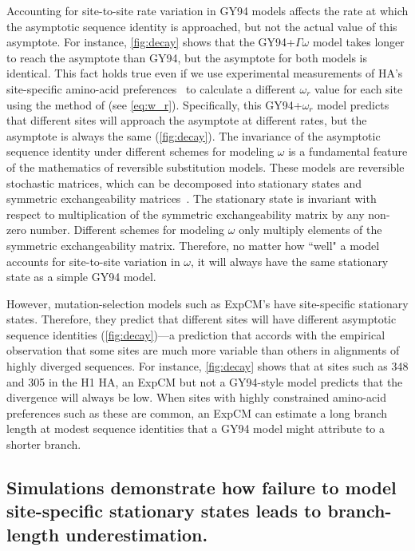 \documentclass[11pt]{article}
\begin{document}
Accounting for site-to-site rate variation in GY94 models affects the rate at which the asymptotic sequence identity is approached, but not the actual value of this asymptote. 
For instance, \ref{fig:decay} shows that the GY94+$\Gamma\omega$ model takes longer to reach the asymptote than GY94, but the asymptote for both models is identical. 
This fact holds true even if we use experimental measurements of HA's site-specific amino-acid preferences~\citep{doud2016accurate} to calculate a different $\omega_r$ value for each site using the method of \citet{spielman2015relationship} (see \ref{eq:w_r}).
Specifically, this GY94+$\omega_r$ model predicts that different sites will approach the asymptote at different rates, but the asymptote is always the same (\ref{fig:decay}).
The invariance of the asymptotic sequence identity under different schemes for modeling $\omega$ is a fundamental feature of the mathematics of reversible substitution models.
These models are reversible stochastic matrices, which can be decomposed into stationary states and symmetric exchangeability matrices~\citep{nielsen2006statistical}.
The stationary state is invariant with respect to multiplication of the symmetric exchangeability matrix by any non-zero number.
Different schemes for modeling $\omega$ only multiply elements of the symmetric exchangeability matrix.
Therefore, no matter how ``well" a model accounts for site-to-site variation in $\omega$, it will always have the same stationary state as a simple GY94 model. 

However, mutation-selection models such as ExpCM's have site-specific stationary states.
Therefore, they predict that different sites will have different asymptotic sequence identities (\ref{fig:decay})---a prediction that accords with the empirical observation that some sites are much more variable than others in alignments of highly diverged sequences.
For instance, \ref{fig:decay} shows that at sites such as 348 and 305 in the H1 HA, an ExpCM but not a GY94-style model predicts that the divergence will always be low. 
When sites with highly constrained amino-acid preferences such as these are common, an ExpCM can estimate a long branch length at modest sequence identities that a GY94 model might attribute to a shorter branch.


\subsection*{Simulations demonstrate how failure to model site-specific stationary states leads to branch-length underestimation.}
\end{document}
